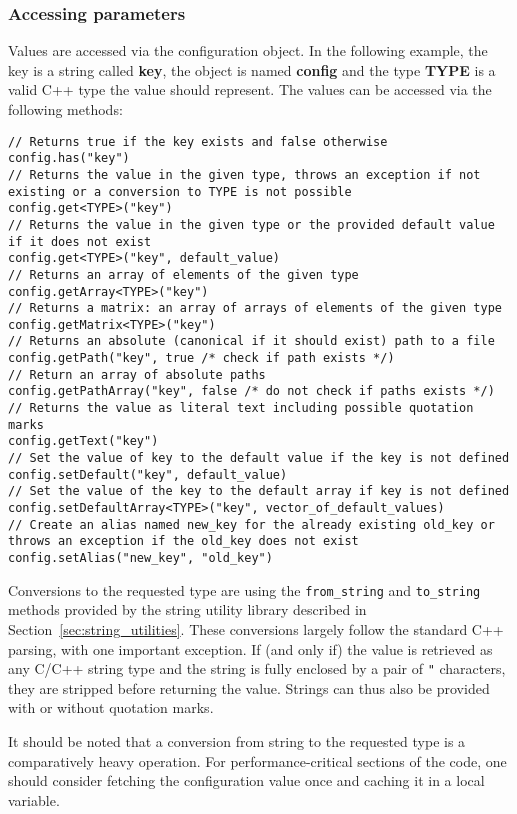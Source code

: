 \subsubsection{Accessing parameters}
\label{sec:accessing_parameters}
Values are accessed via the configuration object.
In the following example, the key is a string called \textbf{key}, the object is named \textbf{config} and the type \textbf{TYPE} is a valid C++ type the value should represent.
The values can be accessed via the following methods:
\begin{verbatim}
// Returns true if the key exists and false otherwise
config.has("key")
// Returns the value in the given type, throws an exception if not existing or a conversion to TYPE is not possible
config.get<TYPE>("key")
// Returns the value in the given type or the provided default value if it does not exist
config.get<TYPE>("key", default_value)
// Returns an array of elements of the given type
config.getArray<TYPE>("key")
// Returns a matrix: an array of arrays of elements of the given type
config.getMatrix<TYPE>("key")
// Returns an absolute (canonical if it should exist) path to a file
config.getPath("key", true /* check if path exists */)
// Return an array of absolute paths
config.getPathArray("key", false /* do not check if paths exists */)
// Returns the value as literal text including possible quotation marks
config.getText("key")
// Set the value of key to the default value if the key is not defined
config.setDefault("key", default_value)
// Set the value of the key to the default array if key is not defined
config.setDefaultArray<TYPE>("key", vector_of_default_values)
// Create an alias named new_key for the already existing old_key or throws an exception if the old_key does not exist
config.setAlias("new_key", "old_key")
\end{verbatim}

Conversions to the requested type are using the \texttt{from\_string} and \texttt{to\_string} methods provided by the string utility library described in Section~\ref{sec:string_utilities}.
These conversions largely follow the standard C++ parsing, with one important exception.
If (and only if) the value is retrieved as any C/C++ string type and the string is fully enclosed by a pair of \texttt{"} characters, they are stripped before returning the value.
Strings can thus also be provided with or without quotation marks.

\begin{warning}
    It should be noted that a conversion from string to the requested type is a comparatively heavy operation.
    For performance-critical sections of the code, one should consider fetching the configuration value once and caching it in a local variable.
\end{warning}

